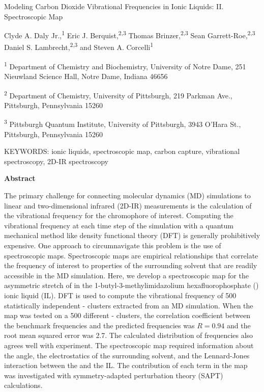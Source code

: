 \documentclass[]{article}
\date{}
\begin{document}
Modeling Carbon Dioxide Vibrational Frequencies in Ionic Liquids: II. Spectroscopic Map

Clyde A. Daly Jr.,\textsuperscript{1} Eric J. Berquist,\textsuperscript{2,3} Thomas Brinzer,\textsuperscript{2,3} Sean Garrett-Roe,\textsuperscript{2,3} Daniel S. Lambrecht,\textsuperscript{2,3} and Steven A. Corcelli\textsuperscript{1}

\textsuperscript{1} Department of Chemistry and Biochemistry, University of Notre Dame, 251 Nieuwland Science Hall, Notre Dame, Indiana 46656

\textsuperscript{2} Department of Chemistry, University of Pittsburgh, 219 Parkman Ave., Pittsburgh, Pennsylvania 15260

\textsuperscript{3} Pittsburgh Quantum Institute, University of Pittsburgh, 3943 O'Hara St., Pittsburgh, Pennsylvania 15260

KEYWORDS: ionic liquids, spectroscopic map, carbon capture, vibrational spectroscopy, 2D-IR spectroscopy

\textbf{Abstract}

The primary challenge for connecting molecular dynamics (MD) simulations to linear and two-dimensional infrared (2D-IR) measurements is the calculation of the vibrational frequency for the chromophore of interest. Computing the vibrational frequency at each time step of the simulation with a quantum mechanical method like density functional theory (DFT) is generally prohibitively expensive. One approach to circumnavigate this problem is the use of spectroscopic maps. Spectroscopic maps are empirical relationships that correlate the frequency of interest to properties of the surrounding solvent that are readily accessible in the MD simulation. Here, we develop a spectroscopic map for the asymmetric stretch of  in the 1-butyl-3-methylimidazolium hexafluorophosphate (\ce{[C4C1im][PF6]}) ionic liquid (IL). DFT is used to compute the vibrational frequency of \num{500} statistically independent -\ce{[C4C1im][PF6]} clusters extracted from an MD simulation. When the map was tested on a \num{500} different -\ce{[C4C1im][PF6]} clusters, the correlation coefficient between the benchmark frequencies and the predicted frequencies was \(R = 0.94\) and the root mean squared error was \SI{2.7}{\wavenumber}. The calculated distribution of frequencies also agrees well with experiment. The spectroscopic map required information about the  angle, the electrostatics of the surrounding solvent, and the Lennard-Jones interaction between the  and the IL. The contribution of each term in the map was investigated with symmetry-adapted perturbation theory (SAPT) calculations.
\end{document}
